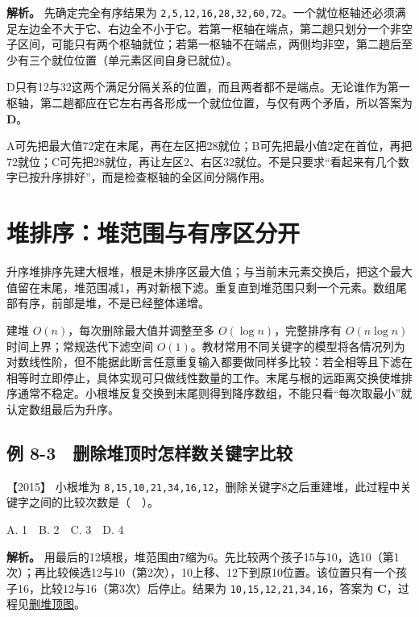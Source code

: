 
\textbf{解析。} 先确定完全有序结果为 \allowbreak{}\texttt{2,}\allowbreak{}\texttt{5,}\allowbreak{}\texttt{12,}\allowbreak{}\texttt{16,}\allowbreak{}\texttt{28,}\allowbreak{}\texttt{32,}\allowbreak{}\texttt{60,}\allowbreak{}\texttt{72}。一个就位枢轴还必须满足左边全不大于它、右边全不小于它。若第一枢轴在端点，第二趟只划分一个非空子区间，可能只有两个枢轴就位；若第一枢轴不在端点，两侧均非空，第二趟后至少有三个就位位置（单元素区间自身已就位）。

D只有12与32这两个满足分隔关系的位置，而且两者都不是端点。无论谁作为第一枢轴，第二趟都应在它左右再各形成一个就位位置，与仅有两个矛盾，所以答案为 \textbf{D}。

A可先把最大值72定在末尾，再在左区把28就位；B可先把最小值2定在首位，再把72就位；C可先把28就位，再让左区2、右区32就位。不是只要求``看起来有几个数字已按升序排好''，而是检查枢轴的全区间分隔作用。

\section{堆排序：堆范围与有序区分开}\label{ds-08-07}

升序堆排序先建大根堆，根是未排序区最大值；与当前末元素交换后，把这个最大值留在末尾，堆范围减1，再对新根下滤。重复直到堆范围只剩一个元素。数组尾部有序，前部是堆，不是已经整体递增。

建堆 \(O(n)\)，每次删除最大值并调整至多 \(O(\log n)\)，完整排序有 \(O(n\log n)\) 时间上界；常规迭代下滤空间 \(O(1)\)。教材常用不同关键字的模型将各情况列为对数线性阶，但不能据此断言任意重复输入都要做同样多比较：若全相等且下滤在相等时立即停止，具体实现可只做线性数量的工作。末尾与根的远距离交换使堆排序通常不稳定。小根堆反复交换到末尾则得到降序数组，不能只看``每次取最小''就认定数组最后为升序。

\subsection{例 8-3　删除堆顶时怎样数关键字比较}\label{ds-ex8-3}

\noindent{}【2015】 小根堆为 \allowbreak{}\texttt{8,}\allowbreak{}\texttt{15,}\allowbreak{}\texttt{10,}\allowbreak{}\texttt{21,}\allowbreak{}\texttt{34,}\allowbreak{}\texttt{16,}\allowbreak{}\texttt{12}，删除关键字8之后重建堆，此过程中关键字之间的比较次数是（　）。

A. 1　B. 2　C. 3　D. 4


\textbf{解析。} 用最后的12填根，堆范围由7缩为6。先比较两个孩子15与10，选10（第1次）；再比较候选12与10（第2次），10上移、12下到原10位置。该位置只有一个孩子16，比较12与16（第3次）后停止。结果为 \allowbreak{}\texttt{10,}\allowbreak{}\texttt{15,}\allowbreak{}\texttt{12,}\allowbreak{}\texttt{21,}\allowbreak{}\texttt{34,}\allowbreak{}\texttt{16}，答案为 \textbf{C}，过程见\hyperref[ds-fig-heap]{删堆顶图}。

